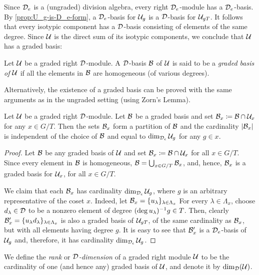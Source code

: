 Since $\mathcal{D}_e$ is a (ungraded) division algebra, every right $\mathcal{D}_e$-module has a $\mathcal{D}_e$-basis. 
By \cref{prop:U_g-is-D_e-form}, a $\mathcal{D}_e$-basis for $\mathcal U_g$ is a $\mathcal{D}$-basis for $\mathcal U_{gT}$. 
It follows that every isotypic component has a $\mathcal{D}$-basis consisting of elements of the same degree. 
Since $\mathcal U$ is the direct sum of its isotypic components, we conclude that $\mathcal U$ has a graded basis:

\begin{defi}
    Let $\mathcal U$ be a graded right $\mathcal{D}$-module. 
    A $\mathcal{D}$-basis $\mathcal B$ of $\mathcal U$ is said to be a \emph{graded basis of $\mathcal U$} if all the elements in $\mathcal B$ are homogeneous (of various degrees).
\end{defi}

\begin{remark}
    Alternatively, the existence of a graded basis can be proved with the same arguments as in the ungraded setting (using Zorn's Lemma).
\end{remark}

\begin{prop}\label{prop:dim-U_x}
    Let $\mathcal U$ be a graded right $\mathcal{D}$-module. 
    Let $\mathcal B$ be a graded basis and set $\mathcal B_x \coloneqq \mathcal B \cap \mathcal U_x$ for any $x\in G/T$. 
    Then the sets $\mathcal B_x$ form a partition of $\mathcal B$ and the cardinality $|\mathcal B_x|$ is independent of the choice of $\mathcal B$ and equal to $\dim_{\mathcal{D}_e} \mathcal U_g$ for any $g\in x$. 
\end{prop}

\begin{proof}
    Let $\mathcal B$ be any graded basis of $\mathcal U$ and set $\mathcal B_x \coloneqq \mathcal B \cap \mathcal U_x$ for all $x\in G/T$. 
    Since every element in $\mathcal B$ is homogeneous, $\mathcal B = \bigcup_{x \in G/T} \mathcal B_x$, and, hence, $\mathcal B_x$ is a graded basis for $\mathcal U_x$, for all $x\in G/T$.
    
    We claim that each $\mathcal B_x$ has cardinality $\dim_{\mathcal{D}_e} \mathcal U_g$, where $g$ is an arbitrary representative of the coset $x$. 
    Indeed, let $\mathcal B_x = \{ u_\lambda\}_{\lambda \in \Lambda_x}$
    For every $\lambda \in \Lambda_x$, choose $d_\lambda \in \mathcal{D}$ to be a nonzero element of degree $(\deg u_\lambda)^{-1} g \in T$. 
    Then, clearly $\mathcal B_x' = \{u_\lambda d_\lambda \}_{\lambda \in \Lambda_x}$ is also a graded basis of $\mathcal U_{gT}$, of the same cardinality as $\mathcal B_x$, but with all elements having degree $g$. 
    It is easy to see that $\mathcal B_x'$ is a $\mathcal{D}_e$-basis of $\mathcal U_g$ and, therefore, it has cardinality $\dim_{\mathcal{D}_e} \mathcal U_g$. 
\end{proof}

\begin{defi}
    We define the \emph{rank} or \emph{$\mathcal{D}$-dimension} of a graded right module $\mathcal U$ to be the cardinality of one (and hence any) graded basis of $\mathcal U$, and denote it by $\dim_{\mathcal{D}} (\mathcal U)$.
\end{defi}

